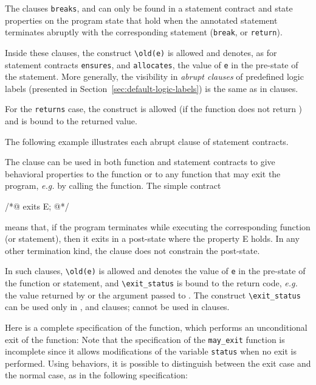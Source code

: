The clauses \lstinline|breaks|, \continues{}
and \returns{}
can only be found in a statement contract and
state properties on the program state that hold when the
annotated statement terminates abruptly with the corresponding
statement (\lstinline|break|, \Continue{} or \lstinline|return|).

Inside these clauses, the construct \lstinline|\old(e)|
is allowed and denotes, as for statement contracts
\lstinline|ensures|, \assigns and \lstinline|allocates|, the value of
\lstinline|e| in the pre-state of the statement.
 More generally, the visibility in \textsl{abrupt clauses} of predefined
logic labels
 (presented in Section~\ref{sec:default-logic-labels}) is the
same as in \ensures{} clauses.

For the \lstinline|returns| case, the \result{}
construct is allowed (if the function does not return \void) and is bound
to the returned value.

\begin{example}
  The following example illustrates each abrupt
  clause of statement contracts.
\end{example}

The \exits{} clause can be used in both function and statement
contracts to give behavioral properties to the \main{} function
or to any function that may exit the program,
\emph{e.g.} by calling the \exit{} function.
The simple contract
\begin{listing-nonumber}
/*@ exits E;
  @*/
\end{listing-nonumber}
means that, if the program terminates while executing the corresponding
function (or statement), then it exits in a post-state where the property
E holds.
In any other termination kind, the \exits{} clause does not constrain
the post-state.

In such clauses, \lstinline|\old(e)|
is allowed and denotes the value of \lstinline|e| in the pre-state of
the function or statement,
and \lstinline|\exit_status| is bound to the return code,
\emph{e.g.} the value returned by \main{} or the argument passed to \exit{}.
The  construct \lstinline|\exit_status|
can be used only in \exits{},
 \assigns{} and \allocates{} clauses;
\result cannot be used in \exits{} clauses.

\begin{example}
\label{ex:assigns-and-abrupt-termination}
  Here is a complete specification of the \exit{} function, which
  performs an unconditional exit of the \main{} function:
  Note that the specification of the \lstinline|may_exit|
  function is incomplete since it allows modifications of the variable
  \lstinline|status| when no exit is performed.
  Using behaviors, it is possible to distinguish between the exit case
  and the normal case, as in the following specification:
\end{example}

